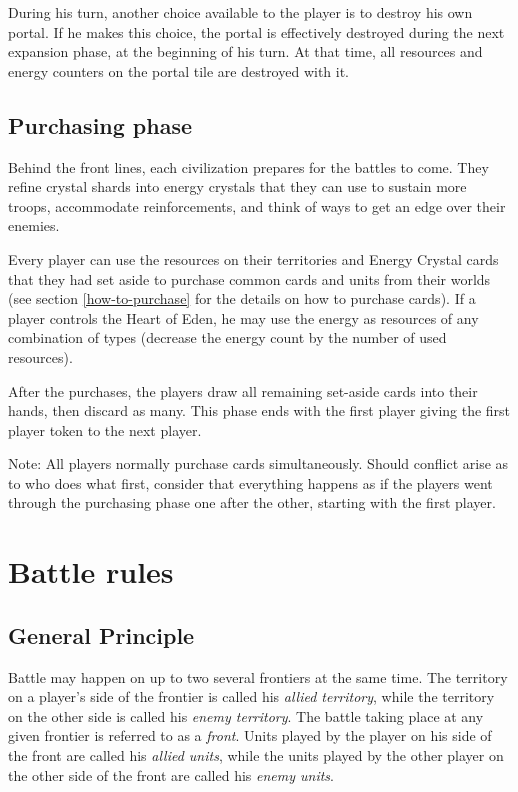 \documentclass[a4paper]{article}
\begin{document}
        During his turn, another choice available to the player
        is to destroy his own portal.
        If he makes this choice, the portal is effectively destroyed
        during the next expansion phase, at the beginning of his turn.
        At that time, all resources and energy counters on the portal tile
        are destroyed with it. 
        
    
    \subsection{Purchasing phase}
        \label{purchase}
        Behind the front lines, each civilization prepares for the battles to come.
        They refine crystal shards into energy crystals that they can use to
        sustain more troops, accommodate reinforcements,
        and think of ways to get an edge over their enemies.
        
        Every player can use the resources on their territories and Energy Crystal cards
        that they had set aside to purchase common cards and units from their worlds
        (see section \ref{how-to-purchase} for the details on how to purchase cards).
        If a player controls the Heart of Eden, he may use the energy as resources
        of any combination of types (decrease the energy count by the number
        of used resources).
        
        After the purchases, the players draw all remaining set-aside cards into their
        hands, then discard as many.        
        This phase ends with the first player giving the first player token
        to the next player.
        
        Note: All players normally purchase cards simultaneously.
        Should conflict arise as to who does what first,
        consider that everything happens as if the players went through
        the purchasing phase one after the other, starting with the first player.


\newpage
\section{Battle rules}
    \label{battle-rules}
    
    \subsection{General Principle}
        Battle may happen on up to two several frontiers at the same time.
        The territory on a player's side of the frontier is called his \textit{allied territory},
        while the territory on the other side is called his \textit{enemy territory}.
        The battle taking place at any given frontier is referred to as a \textit{front}.
        Units played by the player on his side of the front are called his
        \textit{allied units}, while the units played by the other player on the other
        side of the front are called his \textit{enemy units}.
        
\end{document}
